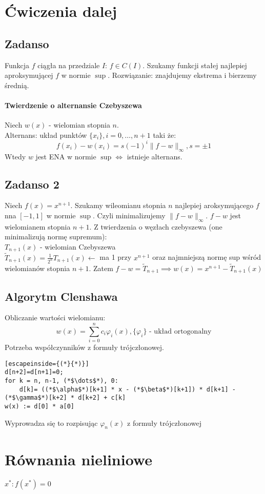 \documentclass{article}
\begin{document}
\section{Ćwiczenia dalej}
\subsection{Zadanso}
Funkcja $ f $ ciągła na przedziale $ I $: $ f\in C(I) $. Szukamy funkcji stałej najlepiej aproksymującej $ f $ w normie $ \sup $.
Rozwiązanie: znajdujemy ekstrema i bierzemy średnią.
\paragraph{Twierdzenie o alternansie Czebyszewa}
Niech $ w(x) $ - wielomian stopnia $ n $.\\
Alternans: układ punktów $ \{x_i\}, i=0,\dots, n+1$ taki że: $$ f(x_i) - w(x_i)=s(-1)^i\|f-w\|_\infty, s=\pm 1 $$
Wtedy $ w $ jest ENA w normie $ \sup \iff$ istnieje alternans.
\subsection{Zadanso 2}
Niech $ f(x)=x^{n+1} $. Szukamy wileomianu stopnia $ n $ najlepiej aroksymującego $ f $ nna $ [-1,1] $ w normie $\sup$.
Czyli minimalizujemy $ \|f-w\|_\infty $.
$ f-w  $ jest wielomianem stopnia $ n+1 $. Z twierdzenia o węzłach czebyszewa (one minimalizują normę supremum):\\
$ T_{n+1}(x) $ - wielomian Czebyszewa\\
$ \tilde{T}_{n+1}(x)=\frac{1}{2^n}T_{n+1}(x) \leftarrow$  ma 1 przy $ x^{n+1} $ oraz najmniejszą normę sup wśród wielomianów stopnia $ n + 1 $.
Zatem $ f-w=\tilde{T}_{n+1}\implies w(x)=x^{n+1}-\tilde{T}_{n+1}(x) $
\subsection{Algorytm Clenshawa}
Obliczanie wartości wielomianu: 
$$ w(x)=\sum_{i=0}^{n}c_i\varphi_i(x), \{\varphi_i\}\text{  - układ ortogonalny} $$
Potrzeba współczynników z formuły trójczłonowej.
\begin{lstlisting}[escapeinside={(*}{*)}]
d[n+2]=d[n+1]=0;
for k = n, n-1, (*$\dots$*), 0:
	d[k]= ((*$\alpha$*)[k+1] * x - (*$\beta$*)[k+1]) * d[k+1] - (*$\gamma$*)[k+2] * d[k+2] + c[k]
w(x) := d[0] * a[0]
\end{lstlisting}
Wyprowadza się to rozpisując $ \varphi_n(x) $ z formuły trójczłonowej
\section{Równania nieliniowe}
$ x^*:f(x^*)=0 $
\end{document}
